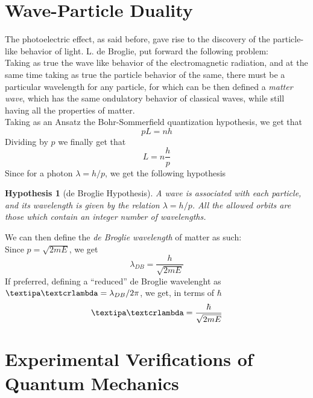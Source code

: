 \documentclass[a4paper, 11pt]{book}
\newcommand{\1}{\opr{\mathds{1}}}
\newcommand{\lbar}{\mbox{\textipa\textcrlambda}}
\theoremstyle{plain}
\newtheorem{hyp}{Hypothesis}
\begin{document}
	\section{Wave-Particle Duality}
	The photoelectric effect, as said before, gave rise to the discovery of the particle-like behavior of light. L. de Broglie, put forward the following problem:\\
	Taking as true the wave like behavior of the electromagnetic radiation, and at the same time taking as true the particle behavior of the same, there must be a particular wavelength for any particle, for which can be then defined a \textit{matter wave}, which has the same ondulatory behavior of classical waves, while still having all the properties of matter.\\
	Taking as an Ansatz the Bohr-Sommerfield quantization hypothesis, we get that
	\begin{equation*}
		pL=nh
	\end{equation*}
	Dividing by $p$ we finally get that
	\begin{equation*}
		L=n\frac{h}{p}
	\end{equation*}
	Since for a photon $\lambda=h/p$, we get the following hypothesis
	\begin{hyp}[de Broglie Hypothesis]
		A wave is associated with each particle, and its wavelength is given by the relation $\lambda=h/p$. All the allowed orbits are those which contain an integer number of wavelengths.
	\end{hyp}
	We can then define the \textit{de Broglie wavelength} of matter as such:\\
	Since $p=\sqrt{2mE}$, we get
	\begin{equation}
		\lambda_{DB}=\frac{h}{\sqrt{2mE}}
		\label{eq:debrogliewavelength}
	\end{equation}
	If preferred, defining a ``reduced'' de Broglie wavelenght as $\lbar=\lambda_{DB}/2\pi$, we get, in terms of $\hbar$
	\begin{equation*}
		\lbar=\frac{\hbar}{\sqrt{2mE}}
	\end{equation*}
	\section{Experimental Verifications of Quantum Mechanics}
\end{document}
